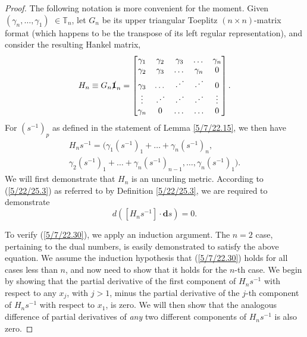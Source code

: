 \documentclass{amsart}
\theoremstyle{definition}
\numberwithin{theorem}{section}
\numberwithin{equation}{section}
\begin{document}
\begin{proof} The following notation is more convenient for the moment.  Given $(\gamma_n,\dots,\gamma_1)$ $\in \mathbb{T}_n$, let $G_n$ be its upper triangular Toeplitz $(n\times n)$-matrix format (which happens to be the transpose of its left regular representation), and consider the resulting Hankel matrix, 
\begin{equation}\label{5/7/22.20} H_n \equiv G_n \slashed{\bf 1}_n = \begin{bmatrix} \gamma_1 & \gamma_2 & \gamma_3 & \dots & \gamma_n \\ \gamma_2 & \gamma_3 & \dots & \gamma_n & 0 \\ \gamma_3 & \dots & \iddots & \iddots & 0  \\ \vdots & \iddots & \iddots & \iddots & \vdots \\ \gamma_n & 0 & \dots & \ldots & 0 \end{bmatrix}.\end{equation}
For $\left( s^{-1} \right)_p$ as defined in the statement of Lemma \ref{5/7/22.15}, we then have
\begin{multline}  H_n s^{-1}   =  \Big( \gamma_1\left( s^{-1} \right)_1  + \dots + \gamma_n \left( s^{-1} \right)_n, \\ \gamma_2\left( s^{-1} \right)_1  + \dots + \gamma_n \left( s^{-1} \right)_{n-1}, 
  \dots , 
 \gamma_n \left( s^{-1} \right)_1 \Big). \label{5/7/22.40}
\end{multline}
 We will first demonstrate that $H_n$ is an uncurling metric.  According to (\ref{5/22/25.3}) as referred to by Definition \ref{5/22/25.3}, we are required to demonstrate 
\begin{equation}\label{5/7/22.30} d\left([H_n s^{-1}]\cdot \mathbf{d}s\right) = 0.\end{equation}  

To verify (\ref{5/7/22.30}), we apply an induction argument.  The $n=2$ case, pertaining to the dual numbers, is easily demonstrated to satisfy the above equation.  We assume the induction hypothesis that (\ref{5/7/22.30}) holds for all cases less than $n$, and now need to show that it holds for the $n$-th case.  
We begin by showing that the partial derivative of the first component of $H_n s^{-1}$ with respect to any $x_j$, with $j>1$, minus the partial derivative of the $j$-th component of $H_n s^{-1}$ with respect to $x_1$, is zero. We will then show that the analogous difference of partial derivatives of {\it any} two different components of $H_ns^{-1}$ is also zero.


\end{proof}
\end{document}
